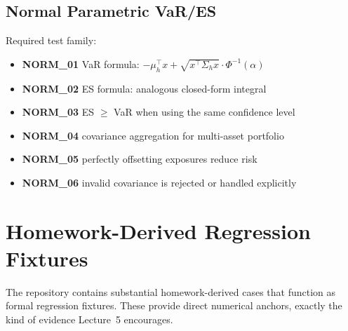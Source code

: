 \documentclass[11pt]{article}
\begin{document}
\subsection{Normal Parametric VaR/ES}

Required test family:

\begin{itemize}
  \item \textbf{NORM\_01} VaR formula: $-\mu_h^\top x + \sqrt{x^\top \Sigma_h x} \cdot \Phi^{-1}(\alpha)$
  \item \textbf{NORM\_02} ES formula: analogous closed-form integral
  \item \textbf{NORM\_03} ES $\geq$ VaR when using the same confidence level
  \item \textbf{NORM\_04} covariance aggregation for multi-asset portfolio
  \item \textbf{NORM\_05} perfectly offsetting exposures reduce risk
  \item \textbf{NORM\_06} invalid covariance is rejected or handled explicitly
\end{itemize}

\section{Homework-Derived Regression Fixtures}

The repository contains substantial homework-derived cases that function
as formal regression fixtures.  These provide direct numerical anchors,
exactly the kind of evidence Lecture~5 encourages.
\end{document}
